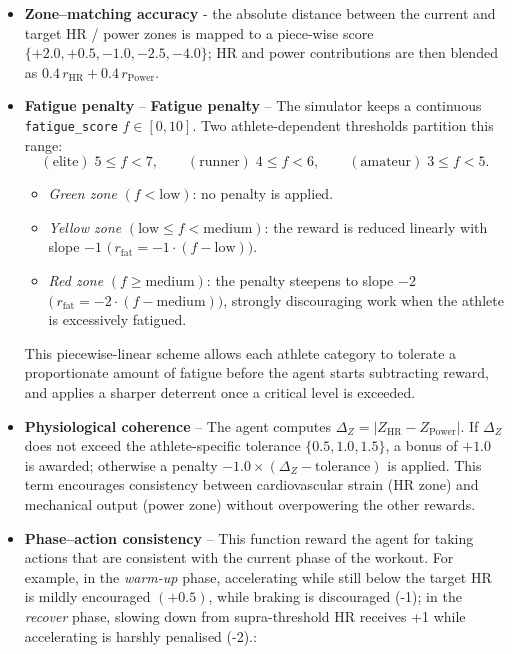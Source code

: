 \begin{itemize}
  
  \item \textbf{Zone–matching accuracy} - the absolute distance between the current and target HR / power zones is mapped to a piece-wise score \(\{+2.0,+0.5,-1.0,-2.5,-4.0\}\); HR and power contributions are then blended as \(0.4\,r_{\text{HR}} + 0.4\,r_{\text{Power}}\).

  \item \textbf{Fatigue penalty} – \textbf{Fatigue penalty} – The simulator keeps a continuous \verb|fatigue_score| \(f \in [0,10]\). Two athlete-dependent thresholds partition this range:
    \[
    (\text{elite})\;5\le f<7,\qquad
    (\text{runner})\;4\le f<6,\qquad
    (\text{amateur})\;3\le f<5 .
    \]

    \begin{itemize}
    \item \emph{Green zone} \((f<\text{low})\): no penalty is applied.  
    \item \emph{Yellow zone} \((\text{low}\le f<\text{medium})\): the
            reward is reduced linearly with slope \(-1\)  
            \(\bigl(\,r_{\mathrm{fat}}=-1\cdot(f-\text{low})\bigr)\).
    \item \emph{Red zone} \((f\ge\text{medium})\): the penalty steepens to
            slope \(-2\)  
            \(\bigl(\,r_{\mathrm{fat}}=-2\cdot(f-\text{medium})\bigr)\),
            strongly discouraging work when the athlete is excessively
            fatigued.
    \end{itemize}

    This piecewise-linear scheme allows each athlete category to tolerate a proportionate amount of fatigue before the agent starts subtracting reward, and applies a sharper deterrent once a critical level is exceeded.


  \item \textbf{Physiological coherence} – The agent computes \(\Delta_Z=\lvert Z_{\text{HR}}-Z_{\text{Power}}\rvert\). If \(\Delta_Z\) does not exceed the athlete-specific tolerance \(\{0.5,1.0,1.5\}\), a bonus of \(+1.0\) is awarded; otherwise a penalty \(-1.0\times(\Delta_Z-\text{tolerance})\) is applied.  This term encourages consistency between cardiovascular strain (HR zone) and mechanical output (power zone) without overpowering the other rewards.

  \item \textbf{Phase–action consistency} – This function reward the agent for taking actions that are consistent with the current phase of the workout.  For example, in the \emph{warm-up} phase, accelerating while still below the target HR is mildly encouraged \((+0.5)\), while braking is discouraged (-1); in the \emph{recover} phase, slowing down from supra-threshold HR receives +1 while accelerating is harshly penalised (-2).:


\end{itemize}
